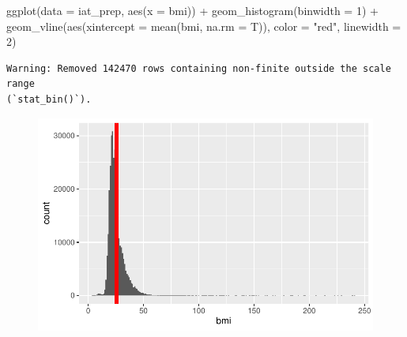 \documentclass[
  letterpaper,
  DIV=11,
  numbers=noendperiod]{scrartcl}
\newenvironment{Shaded}{\begin{snugshade}}{\end{snugshade}}
\newcommand{\AttributeTok}[1]{\textcolor[rgb]{0.40,0.45,0.13}{#1}}
\newcommand{\DecValTok}[1]{\textcolor[rgb]{0.68,0.00,0.00}{#1}}
\newcommand{\FunctionTok}[1]{\textcolor[rgb]{0.28,0.35,0.67}{#1}}
\newcommand{\NormalTok}[1]{\textcolor[rgb]{0.00,0.23,0.31}{#1}}
\newcommand{\OtherTok}[1]{\textcolor[rgb]{0.00,0.23,0.31}{#1}}
\newcommand{\SpecialCharTok}[1]{\textcolor[rgb]{0.37,0.37,0.37}{#1}}
\newcommand{\StringTok}[1]{\textcolor[rgb]{0.13,0.47,0.30}{#1}}
\begin{document}
\begin{Shaded}
\end{Shaded}

\begin{Shaded}
\begin{Highlighting}[]
\FunctionTok{ggplot}\NormalTok{(}\AttributeTok{data =}\NormalTok{ iat\_prep, }\FunctionTok{aes}\NormalTok{(}\AttributeTok{x =}\NormalTok{ bmi)) }\SpecialCharTok{+} 
  \FunctionTok{geom\_histogram}\NormalTok{(}\AttributeTok{binwidth =} \DecValTok{1}\NormalTok{) }\SpecialCharTok{+}
  \FunctionTok{geom\_vline}\NormalTok{(}\FunctionTok{aes}\NormalTok{(}\AttributeTok{xintercept =} \FunctionTok{mean}\NormalTok{(bmi, }
                                   \AttributeTok{na.rm =}\NormalTok{ T)), }
             \AttributeTok{color =} \StringTok{"red"}\NormalTok{, }\AttributeTok{linewidth =} \DecValTok{2}\NormalTok{)}
\end{Highlighting}
\end{Shaded}

\begin{verbatim}
Warning: Removed 142470 rows containing non-finite outside the scale range
(`stat_bin()`).
\end{verbatim}

\begin{figure}[H]

{\centering \includegraphics{BMI_help_files/figure-pdf/unnamed-chunk-14-1.pdf}

}

\end{figure}
\end{document}
